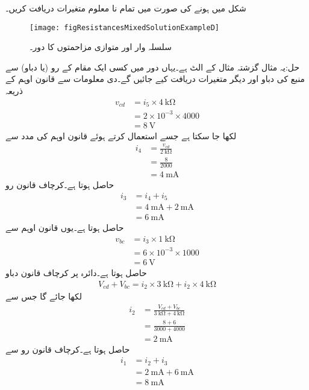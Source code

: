 
شکل  میں  ہونے کی صورت میں تمام نا معلوم متغیرات دریافت کریں۔

\begin{figure}
\centering
\texttt{[image: figResistancesMixedSolutionExampleD]}
\caption{سلسلہ وار اور متوازی مزاحمتوں کا دور۔}
\label{شکل_مزاحمتی_دور_کا_حل}
\end{figure}

حل:یہ مثال گزشتہ مثال کے الٹ ہے۔یہاں دور میں کسی ایک مقام کے رو (یا دباو) سے منبع کی دباو اور دیگر متغیرات دریافت کیے جائیں گے۔دی معلومات سے قانون اوہم کے ذریعہ
\begin{align*}
v_{cd}&=i_5 \times \SI{4}{\kilo\ohm}\\
&=2\times 10^{-3}\times 4000\\
&=\SI{8}{\volt}
\end{align*}
لکھا جا سکتا ہے جسے استعمال کرتے ہوئے قانون اوہم کی مدد سے
\begin{align*}
i_4&=\frac{v_{cd}}{\SI{2}{\kilo\ohm}}\\
&=\frac{8}{2000}\\
&=\SI{4}{\milli\ampere}
\end{align*}
حاصل ہوتا ہے۔کرچاف قانون رو 
\begin{align*}
i_3&=i_4+i_5\\
&=\SI{4}{\milli\ampere}+\SI{2}{\milli\ampere}\\
&=\SI{6}{\milli\ampere}
\end{align*}
حاصل ہوتا ہے۔یوں قانون اوہم سے
\begin{align*}
v_{bc}&=i_3 \times \SI{1}{\kilo\ohm}\\
&=6\times 10^{-3} \times 1000\\
&=\SI{6}{\volt}
\end{align*}
حاصل ہوتا ہے۔دائرہ  پر کرچاف قانون دباو
\begin{align*}
V_{cd}+V_{bc}=i_2 \times \SI{3}{\kilo\ohm}+i_2\times \SI{4}{\kilo\ohm}
\end{align*}
لکھا جائے گا جس سے
\begin{align*}
i_2&=\frac{V_{cd}+V_{bc}}{\SI{3}{\kilo\ohm}+\SI{4}{\kilo\ohm}}\\
&=\frac{8+6}{3000+4000}\\
&=\SI{2}{\milli\ampere}
\end{align*}
حاصل ہوتا ہے۔کرچاف قانون رو سے
\begin{align*}
i_1&=i_2+i_3\\
&=\SI{2}{\milli\ampere}+\SI{6}{\milli\ampere}\\
&=\SI{8}{\milli\ampere}
\end{align*}
